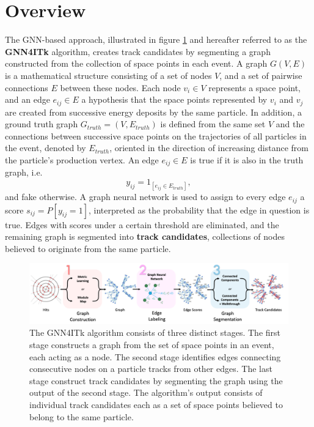 \section{Overview}

The GNN-based approach, illustrated in figure \ref{fig:gnn4itk} and hereafter referred to as the \textbf{GNN4ITk} algorithm, creates track candidates by segmenting a graph constructed from the collection of space points in each event. 
A graph $G(V,E)$ is a mathematical structure consisting of a set of nodes $V$, and a set of pairwise connections $E$ between these nodes. 
Each node $v_i \in V$ represents a space point, and an edge $e_{ij} \in E$ a hypothesis that the space points represented by $v_i$ and $v_j$ are created from successive energy deposits by the same particle. 
In addition, a ground truth graph $G_{truth}= (V, E_{truth})$ is defined from the same set $V$ and the connections between successive space points on the trajectories of all particles in the event, denoted by $E_{truth}$, oriented in the direction of increasing distance from the particle's production vertex. 
An edge $e_{ij}\in E$ is true if it is also in the truth graph, i.e. 
\begin{equation}
\label{eq:9.1}
y_{ij} = 1_{[e_{ij} \in E_{truth}]},
\end{equation}
and fake otherwise. 
A graph neural network is used to assign to every edge $e_{ij} $ a score $s_{ij} = P[y_{ij} = 1]$, interpreted as the probability that the edge in question is true. 
Edges with scores under a certain threshold are eliminated, and the remaining graph is segmented into \textbf{track candidates}, collections of nodes believed to originate from the same particle.

\begin{figure}[h!]
    \centering
    \includegraphics[width=\textwidth]{figures/gnn4itk.png}
    \caption{The GNN4ITk algorithm consists of three distinct stages. The first stage constructs a graph from the set of space points in an event, each acting as a node. The second stage identifies edges connecting consecutive nodes on a particle tracks from other edges. The last stage construct track candidates by segmenting the graph using the output of the second stage. The algorithm's output consists of individual track candidates each as a set of space points believed to belong to the same particle.}
    \label{fig:gnn4itk}
\end{figure}

